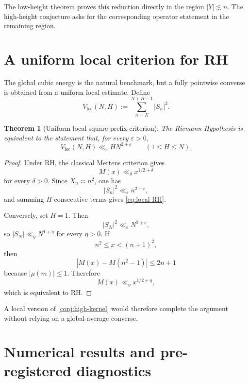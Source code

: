 \documentclass[11pt]{article}
\newtheorem{theorem}{Theorem}[section]
\theoremstyle{definition}
\theoremstyle{remark}
\newcommand{\eps}{\varepsilon}
\newcommand{\1}{\mathbf{1}}
\begin{document}
The low-height theorem proves this reduction directly in the region $|Y|\lesssim n$.  The high-height conjecture asks for the corresponding operator statement in the remaining region.

\section{A uniform local criterion for RH}
\label{sec:local-criterion}

The global cubic energy is the natural benchmark, but a fully pointwise converse is obtained from a uniform local estimate.  Define
\begin{equation}
 V_{\mathrm{loc}}(N,H)
 :=\sum_{n=N}^{N+H-1}|S_n|^2.
 \label{eq:Vloc}
\end{equation}

\begin{theorem}[Uniform local square-prefix criterion]
\label{thm:local-RH}
The Riemann Hypothesis is equivalent to the statement that, for every $\eps>0$,
\begin{equation}
 V_{\mathrm{loc}}(N,H)
 \ll_\eps HN^{2+\eps}
 \qquad(1\le H\le N).
 \label{eq:local-RH}
\end{equation}
\end{theorem}

\begin{proof}
Under RH, the classical Mertens criterion gives
\[
 M(x)\ll_\delta x^{1/2+\delta}
\]
for every $\delta>0$.  Since $X_n\asymp n^2$, one has
\[
 |S_n|^2\ll_\eps n^{2+\eps},
\]
and summing $H$ consecutive terms gives \cref{eq:local-RH}.

Conversely, set $H=1$.  Then
\[
 |S_N|^2\ll_\eps N^{2+\eps},
\]
so $|S_N|\ll_\eta N^{1+\eta}$ for every $\eta>0$.  If
\[
 n^2\le x<(n+1)^2,
\]
then
\[
 |M(x)-M(n^2-1)|\le2n+1
\]
because $|\mu(m)|\le1$.  Therefore
\[
 M(x)\ll_\eta x^{1/2+\eta},
\]
which is equivalent to RH.
\end{proof}

A local version of \cref{conj:high-kernel} would therefore complete the argument without relying on a global-average converse.

\section{Numerical results and pre-registered diagnostics}
\label{sec:numerics}
\end{document}
